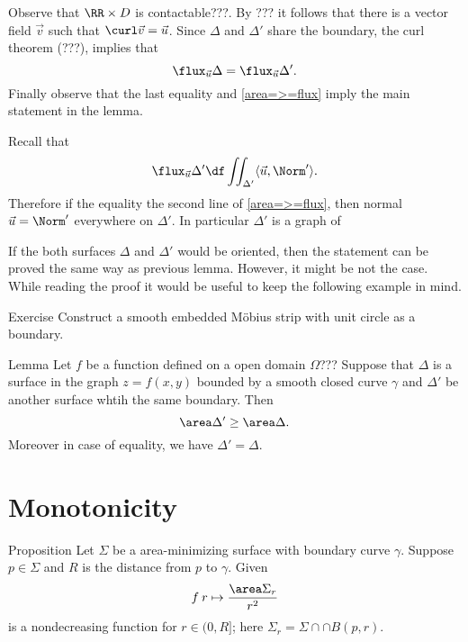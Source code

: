 Observe that $\RR\times D$ is contactable???.
By ??? it follows that there is a vector field $\vec v$ such that $\curl \vec v=\vec u$.
Since $\Delta$ and $\Delta'$ share the boundary, the curl theorem (???), implies that 
\[\flux_{\vec u}\Delta=\flux_{\vec u}\Delta'.\]
Finally observe that the last equality and \ref{area=>=flux} imply the main statement in the lemma.

Recall that
\[\flux_{\vec u}\Delta'\df\iint_{\Delta'}\langle\vec u,\Norm'\rangle.\]
Therefore if the equality the second line of \ref{area=>=flux}, then normal $\vec u=\Norm'$ everywhere on $\Delta'$.
In particular $\Delta'$ is a graph of 
\qeds

If the both surfaces $\Delta$ and $\Delta'$ would be oriented,
then the statement can be proved the same way as previous lemma.
However, it might be not the case.
While reading the proof it would be useful to keep the following example in mind.

\begin{thm}{Exercise}
Construct a smooth embedded M\"obius strip with unit circle as a boundary. 
\end{thm}

\begin{thm}{Lemma}
Let $f$ be a function defined on a open domain $\Omega$???
Suppose that $\Delta$ is a surface in the graph $z=f(x,y)$ bounded by a smooth closed curve $\gamma$ and $\Delta'$ be another surface whtih the same boundary.
Then
\[\area\Delta'\ge\area \Delta.\]
Moreover in case of equality, we have $\Delta'=\Delta$.
\end{thm}















\section*{Monotonicity}

\begin{thm}{Proposition}
Let $\Sigma$ be a area-minimizing surface with boundary curve $\gamma$.
Suppose $p\in \Sigma$ and $R$ is the distance from $p$ to $\gamma$.
Given 
\[f\:r\mapsto \frac{\area \Sigma_r}{r^2}\]
is a nondecreasing function for $r\in (0,R]$;
here $\Sigma_r=\Sigma\cap \cap B(p,r)$.
\end{thm}

